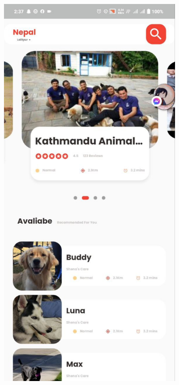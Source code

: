 \begin{figure}[H]
\begin{subfigure}{0.32\textwidth}
    \label{subfig:2}
  \end{subfigure}%
  \hfill
  \begin{subfigure}{0.29\textwidth}
    \includegraphics[width=\linewidth]{img/UI3.jpg}
    \label{subfig:3}
  \end{subfigure}


\end{figure}

